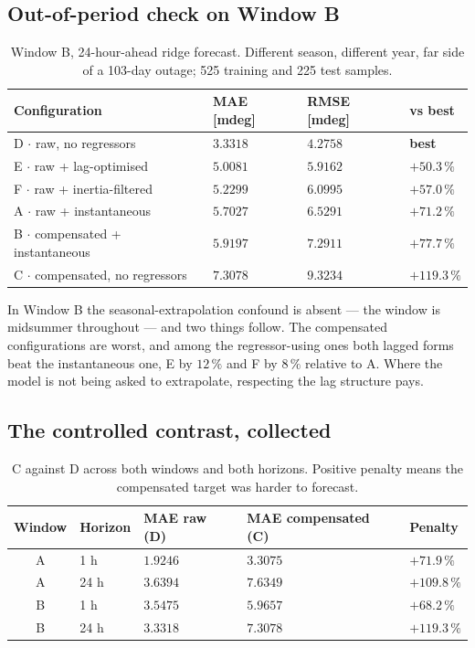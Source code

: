 \documentclass[11pt,a4paper]{article}
\begin{document}
\subsection{Out-of-period check on Window B}

\begin{table}[H]
\centering
\caption{Window B, 24-hour-ahead ridge forecast. Different season, different year, far
side of a 103-day outage; 525 training and 225 test samples.}
\small
\begin{tabular}{@{}l R{2.4cm} R{2.4cm} R{2.4cm}@{}}
\toprule
\textbf{Configuration} & \textbf{MAE [mdeg]} & \textbf{RMSE [mdeg]} & \textbf{vs best}\\
\midrule
D $\cdot$ raw, no regressors          & $\mathbf{3.3318}$ & $4.2758$ & \textbf{best}\\
E $\cdot$ raw + lag-optimised         & $5.0081$ & $5.9162$ & $+50.3\,\%$\\
F $\cdot$ raw + inertia-filtered      & $5.2299$ & $6.0995$ & $+57.0\,\%$\\
A $\cdot$ raw + instantaneous         & $5.7027$ & $6.5291$ & $+71.2\,\%$\\
B $\cdot$ compensated + instantaneous & $5.9197$ & $7.2911$ & $+77.7\,\%$\\
C $\cdot$ compensated, no regressors  & $7.3078$ & $9.3234$ & $+119.3\,\%$\\
\bottomrule
\end{tabular}
\end{table}

In Window B the seasonal-extrapolation confound is absent --- the window is midsummer
throughout --- and two things follow. The compensated configurations are worst, and
among the regressor-using ones both lagged forms beat the instantaneous one, E by
$12\,\%$ and F by $8\,\%$ relative to A. Where the model is not being asked to
extrapolate, respecting the lag structure pays.

\subsection{The controlled contrast, collected}

\begin{table}[H]
\centering
\caption{C against D across both windows and both horizons. Positive penalty means the
compensated target was harder to forecast.}
\begin{tabular}{@{}c l R{2.6cm} R{3.0cm} R{2.6cm}@{}}
\toprule
\textbf{Window} & \textbf{Horizon} & \textbf{MAE raw (D)} & \textbf{MAE compensated (C)} & \textbf{Penalty}\\
\midrule
A & 1 h  & $1.9246$ & $3.3075$ & $+71.9\,\%$\\
A & 24 h & $3.6394$ & $7.6349$ & $+109.8\,\%$\\
B & 1 h  & $3.5475$ & $5.9657$ & $+68.2\,\%$\\
B & 24 h & $3.3318$ & $7.3078$ & $+119.3\,\%$\\
\bottomrule
\end{tabular}
\end{table}
\end{document}
